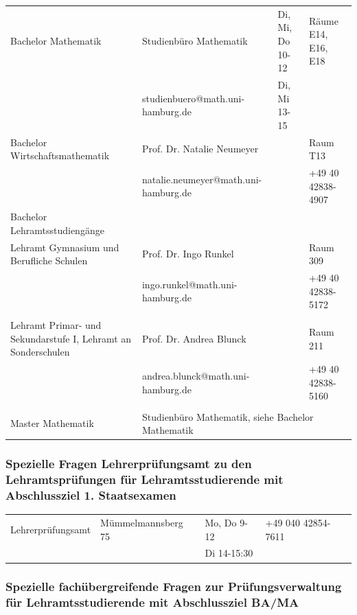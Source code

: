 \documentclass[11pt,a4paper,oneside,landscape]{article}
\begin{document}

\begin{tabularx}{\textwidth}{|X|X|X|X|}
\hline Bachelor Mathematik&Studienbüro Mathematik&Di, Mi, Do \hfill 10-12
	&Räume E14, E16, E18\\
	&studienbuero@math.uni-hamburg.de&Di, Mi \hfill13-15&\\
\hline Bachelor Wirtschaftsmathematik %
&Prof. Dr. Natalie Neumeyer& \hfill &Raum T13\\
&natalie.neumeyer@math.uni-hamburg.de&&+49 40 42838-4907\\
\hline Bachelor Lehramtsstudiengänge&&&\\
Lehramt Gymnasium und Berufliche Schulen&Prof. Dr. Ingo Runkel&&Raum 309\\
    &ingo.runkel@math.uni-hamburg.de&&+49 40 42838-5172\\
    &&&\\
Lehramt Primar- und Sekundarstufe I, Lehramt an Sonderschulen
    &Prof. Dr. Andrea Blunck& \hfill &Raum 211\\
    &andrea.blunck@math.uni-hamburg.de&&+49 40 42838-5160\\
    &&&\\
\hline Master Mathematik
    &\multicolumn{3}{|l|}{Studienbüro Mathematik, siehe Bachelor Mathematik}\\
\hline
\end{tabularx}

\subsubsection{Spezielle Fragen Lehrerprüfungsamt zu den Lehramtsprüfungen für Lehramtsstudierende mit Abschlussziel 1. Staatsexamen
}

\begin{tabularx}{\textwidth}{|X|X|X|X|}
\hline Lehrerprüfungsamt&Mümmelmannsberg 75&Mo, Do \hfill 9-12
    &+49 040 42854-7611\\
    &&Di \hfill 14-15:30&\\
\hline
\end{tabularx}

\subsubsection{Spezielle fachübergreifende Fragen zur Prüfungsverwaltung für Lehramtsstudierende mit Abschlussziel BA/MA}
\end{document}
